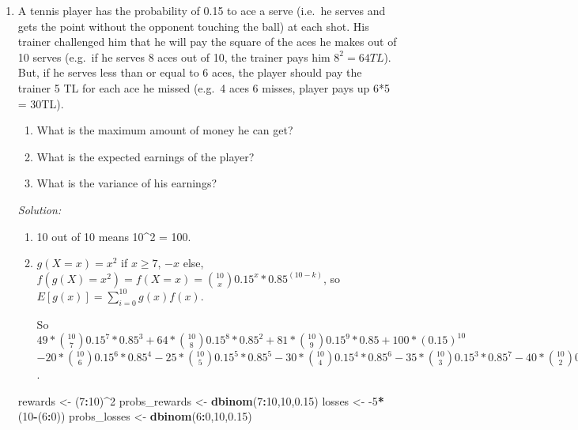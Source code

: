 \documentclass[]{book}
\newenvironment{Shaded}{\begin{snugshade}}{\end{snugshade}}
\newcommand{\DecValTok}[1]{\textcolor[rgb]{0.00,0.00,0.81}{#1}}
\newcommand{\FloatTok}[1]{\textcolor[rgb]{0.00,0.00,0.81}{#1}}
\newcommand{\KeywordTok}[1]{\textcolor[rgb]{0.13,0.29,0.53}{\textbf{#1}}}
\newcommand{\NormalTok}[1]{#1}
\newcommand{\OperatorTok}[1]{\textcolor[rgb]{0.81,0.36,0.00}{\textbf{#1}}}
\newcommand{\StringTok}[1]{\textcolor[rgb]{0.31,0.60,0.02}{#1}}
\providecommand{\tightlist}{%
  \setlength{\itemsep}{0pt}\setlength{\parskip}{0pt}}
\theoremstyle{definition}
\theoremstyle{definition}
\theoremstyle{definition}
\theoremstyle{remark}
\begin{document}
\begin{enumerate}
  \[8-5-4-3\] \[8-5-3-4\] \[8-4-5-3\] \[4-5-3-8\] \[\dots\]
  \[**3-4-5-8**\]

  So, the answer is \(1/(4!) = 1/24\).
\item
  A tennis player has the probability of 0.15 to ace a serve (i.e.~he
  serves and gets the point without the opponent touching the ball) at
  each shot. His trainer challenged him that he will pay the square of
  the aces he makes out of 10 serves (e.g.~if he serves 8 aces out of
  10, the trainer pays him \(8^2 = 64TL\)). But, if he serves less than
  or equal to 6 aces, the player should pay the trainer 5 TL for each
  ace he missed (e.g.~4 aces 6 misses, player pays up 6*5 = 30TL).

  \begin{enumerate}
  \def\labelenumii{\alph{enumii})}
  \tightlist
  \item
    What is the maximum amount of money he can get?
  \item
    What is the expected earnings of the player?
  \item
    What is the variance of his earnings?
  \end{enumerate}

  \emph{Solution:}

  \begin{enumerate}
  \def\labelenumii{\alph{enumii})}
  \item
    10 out of 10 means 10\^{}2 = 100.
  \item
    \(g(X = x) = x^2\) if \(x \geq 7\), \(-x\) else,
    \(f(g(X) = x^2) = f(X = x) = \binom{10}{x} 0.15^x * 0.85^(10-k)\),
    so \(E[g(x)] = \sum_{i=0}^10 g(x)f(x)\).

    So
    \(49 * \binom{10}{7} 0.15^7 * 0.85^3 + 64 * \binom{10}{8} 0.15^8 * 0.85^2 + 81 * \binom{10}{9} 0.15^9 * 0.85 + 100 * (0.15)^10\)
    \(-20 * \binom{10}{6} 0.15^6 * 0.85^4 -25 * \binom{10}{5} 0.15^5 * 0.85^5 - 30 * \binom{10}{4} 0.15^4 * 0.85^6 - 35 * \binom{10}{3} 0.15^3 * 0.85^7 - 40 * \binom{10}{2} 0.15^2 * 0.85^8 - 45 * \binom{10}{1} 0.15^1 * 0.85^9 - 50 * 0.85^10 = -42.5TL\).
  \end{enumerate}

\begin{Shaded}
\begin{Highlighting}[]
\NormalTok{rewards <-}\StringTok{ }\NormalTok{(}\DecValTok{7}\OperatorTok{:}\DecValTok{10}\NormalTok{)}\OperatorTok{^}\DecValTok{2}
\NormalTok{probs_rewards <-}\StringTok{ }\KeywordTok{dbinom}\NormalTok{(}\DecValTok{7}\OperatorTok{:}\DecValTok{10}\NormalTok{,}\DecValTok{10}\NormalTok{,}\FloatTok{0.15}\NormalTok{)}
\NormalTok{losses <-}\StringTok{ }\DecValTok{-5}\OperatorTok{*}\NormalTok{(}\DecValTok{10}\OperatorTok{-}\NormalTok{(}\DecValTok{6}\OperatorTok{:}\DecValTok{0}\NormalTok{))}
\NormalTok{probs_losses <-}\StringTok{ }\KeywordTok{dbinom}\NormalTok{(}\DecValTok{6}\OperatorTok{:}\DecValTok{0}\NormalTok{,}\DecValTok{10}\NormalTok{,}\FloatTok{0.15}\NormalTok{)}


\end{Highlighting}
\end{Shaded}
\end{enumerate}
\end{document}
